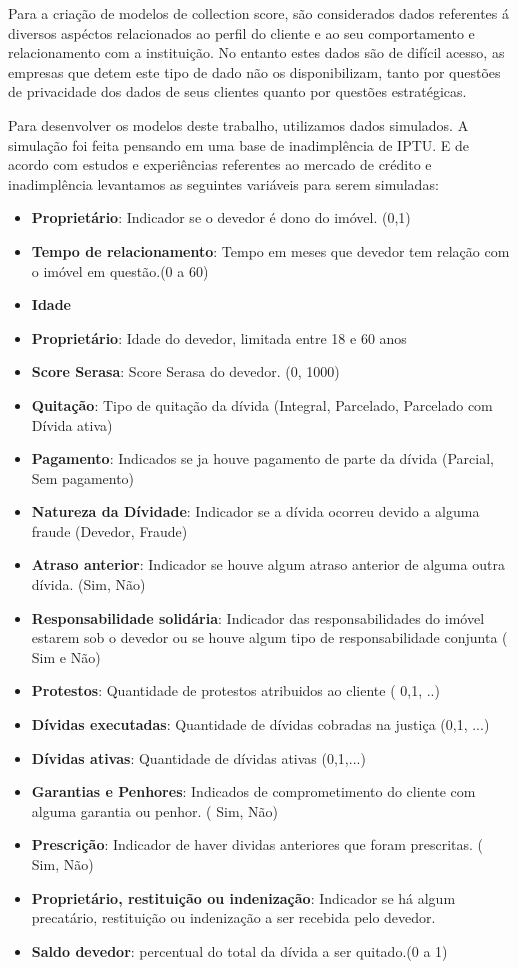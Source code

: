 Para a criação de modelos de collection score, são considerados dados referentes á diversos aspéctos relacionados ao perfil do cliente e ao seu comportamento e relacionamento com a instituição. No entanto estes dados são de difícil acesso, as empresas que detem este tipo de dado não os disponibilizam, tanto por questões de privacidade dos dados de seus clientes quanto por questões estratégicas.

Para desenvolver os modelos deste trabalho, utilizamos dados simulados. A simulação foi feita pensando em uma base de inadimplência de IPTU. E de acordo com estudos e experiências referentes ao mercado de crédito e inadimplência levantamos as seguintes variáveis para serem simuladas:

\begin{itemize}

 \item \textbf{Proprietário}: Indicador se o devedor é dono do imóvel. (0,1)
 \item \textbf{Tempo de relacionamento}: Tempo em meses que devedor tem relação com o imóvel em questão.(0 a 60)
 \item \textbf{Idade}
 \item \textbf{Proprietário}: Idade do devedor, limitada entre 18 e 60 anos
 \item \textbf{Score Serasa}: Score Serasa do devedor. (0, 1000)
 \item \textbf{Quitação}: Tipo de quitação da dívida (Integral, Parcelado, Parcelado com Dívida ativa)
 \item \textbf{Pagamento}: Indicados se ja houve pagamento de parte da dívida (Parcial, Sem pagamento)
 \item \textbf{Natureza da Dívidade}: Indicador se a dívida ocorreu devido a alguma fraude (Devedor, Fraude)
 \item \textbf{Atraso anterior}: Indicador se houve algum atraso anterior de alguma outra dívida. (Sim, Não)
 \item \textbf{Responsabilidade solidária}: Indicador das responsabilidades do imóvel estarem sob o devedor ou se houve algum tipo de responsabilidade conjunta ( Sim e Não)
 \item \textbf{Protestos}: Quantidade de protestos atribuidos ao cliente ( 0,1, ..)
 \item \textbf{Dívidas executadas}: Quantidade de dívidas cobradas na justiça (0,1, ...)
 \item \textbf{Dívidas ativas}: Quantidade de dívidas ativas (0,1,...)
  \item \textbf{Garantias e Penhores}: Indicados de comprometimento do cliente com alguma garantia ou penhor. ( Sim, Não)
  \item \textbf{Prescrição}: Indicador de haver dividas anteriores que foram prescritas. ( Sim, Não)
  \item \textbf{Proprietário, restituição ou indenização}: Indicador se há algum precatário, restituição ou indenização a ser recebida pelo devedor.
  \item \textbf{Saldo devedor}: percentual do total da dívida a ser quitado.(0 a 1)
     
\end{itemize}

